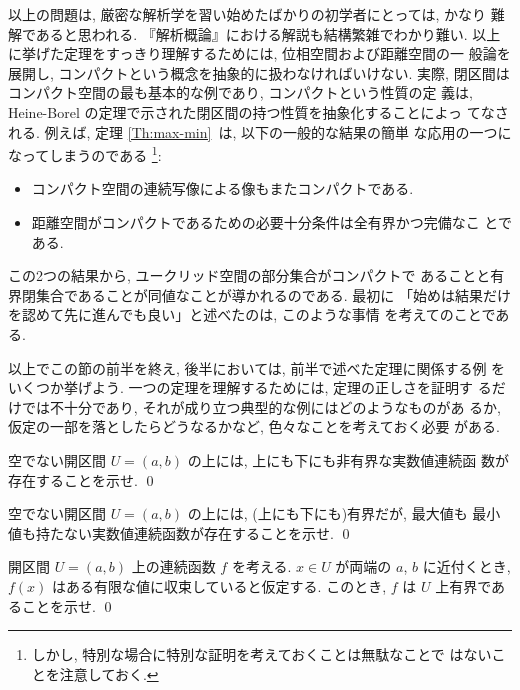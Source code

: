 \documentclass[12pt,twoside]{jarticle}
\begin{document}
\medskip
\begin{small}

以上の問題は, 厳密な解析学を習い始めたばかりの初学者にとっては, かなり
難解であると思われる. 『解析概論』における解説も結構繁雑でわかり難い. 
以上に挙げた定理をすっきり理解するためには, 位相空間および距離空間の一
般論を展開し, コンパクトという概念を抽象的に扱わなければいけない. 実際, 
閉区間はコンパクト空間の最も基本的な例であり, コンパクトという性質の定
義は, Heine-Borel の定理で示された閉区間の持つ性質を抽象化することによっ
てなされる. 例えば, 定理 \ref{Th:max-min}\ は, 以下の一般的な結果の簡単
な応用の一つになってしまうのである%
\footnote{しかし, 特別な場合に特別な証明を考えておくことは無駄なことで
  はないことを注意しておく. }:

\begin{itemize}
\item コンパクト空間の連続写像による像もまたコンパクトである.
\item 距離空間がコンパクトであるための必要十分条件は全有界かつ完備なこ
  とである.
\end{itemize}

\noindent この2つの結果から, ユークリッド空間の部分集合がコンパクトで
あることと有界閉集合であることが同値なことが導かれるのである. 最初に
「始めは結果だけを認めて先に進んでも良い」と述べたのは, このような事情
を考えてのことである. 

\end{small}

以上でこの節の前半を終え, 後半においては, 前半で述べた定理に関係する例
をいくつか挙げよう. 一つの定理を理解するためには, 定理の正しさを証明す
るだけでは不十分であり, それが成り立つ典型的な例にはどのようなものがあ
るか, 仮定の一部を落としたらどうなるかなど, 色々なことを考えておく必要
がある.

\begin{question}
  空でない開区間 $U=(a,b)$ の上には, 上にも下にも非有界な実数値連続函
  数が存在することを示せ.  \qed
\end{question}


\begin{question}
  空でない開区間 $U=(a,b)$ の上には, (上にも下にも)有界だが, 最大値も
  最小値も持たない実数値連続函数が存在することを示せ. \qed
\end{question}

\begin{question}
  開区間 $U=(a,b)$ 上の連続函数 $f$ を考える. $x\in U$ が両端の %
  $a$, $b$ に近付くとき, $f(x)$ はある有限な値に収束していると仮定する. 
  このとき, $f$ は $U$ 上有界であることを示せ. \qed
\end{question}
\end{document}
